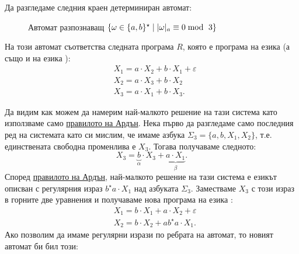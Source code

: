 \begin{example}
  Да разгледаме следния краен детерминиран автомат:
  \begin{figure}[H]
    \centering
    \caption{Автомат разпознаващ $\{\omega \in \{a,b\}^\star \mid \abs{\omega}_{a} \equiv 0 \bmod\ 3\}$}
  \end{figure}
  На този автомат съответства следната програма $R$, която е програма на езика \REGPP (а също и на езика \REG):
  \begin{align*}
    & X_1 = a \cdot X_2 + b \cdot X_1 + \varepsilon \\
    & X_2 = a \cdot X_3 + b \cdot X_2\\
    & X_3 = a \cdot X_1 + b \cdot X_3.
  \end{align*}

  Да видим как можем да намерим най-малкото решение на тази система като използваме само \hyperref[prob:reg:arden]{правилото на Ардън}.
  Нека първо да разгледаме само последния ред на системата като си мислим, че имаме азбука $\Sigma_3 = \{a,b,X_1,X_2\}$, т.е. единствената свободна променлива е $X_3$.
  Тогава получаваме следното:
  \[X_3 = \underbrace{b}_{\alpha} \cdot X_3 + \underbrace{a \cdot X_1}_{\beta}.\]
  Според \hyperref[prob:reg:arden]{правилото на Ардън}, най-малкото решение на тази система е езикът описван с регулярния израз $b^\star a \cdot X_1$
  над азбуката $\Sigma_3$.
  Заместваме $X_3$ с този израз в горните две уравнения и получаваме нова програма на езика \REGPP:
  \begin{align*}
    & X_1 = b \cdot X_1 + a \cdot X_2 + \varepsilon \\
    & X_2 = b \cdot X_2 + a b^\star a \cdot X_1.
  \end{align*}
  Ако позволим да имаме регулярни изрази по ребрата на автомат, то новият автомат би бил този:


\end{example}
